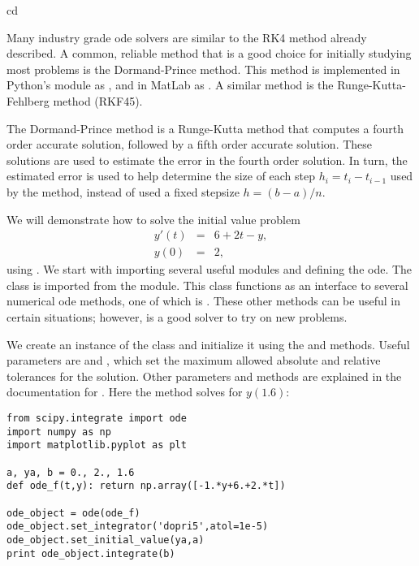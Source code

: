 cd 
\label{lab:DormandPrince}

Many industry grade ode solvers are similar to the RK4 method already described. A common, reliable method that is a good choice for initially studying most problems is the Dormand-Prince method. This method is implemented in Python's  module as , and in MatLab as . A similar method is the Runge-Kutta-Fehlberg method (RKF45). 

The Dormand-Prince method is a Runge-Kutta method that computes a fourth order accurate solution, followed by a fifth order accurate solution. These solutions are used to estimate the error in the fourth order solution. In turn, the estimated error is used to help determine the size of each step $h_i = t_i-t_{i-1}$ used by the method, instead of used a fixed stepsize $h = (b-a)/n$. 

We will demonstrate how to solve the initial value problem
\begin{eqnarray*}
y'(t) &=& 6+2t-y, \\
y(0) &=& 2,
\end{eqnarray*}
using . We start with importing several useful modules and defining the ode. 
The  class is imported from the  module. 
This class functions as an interface to several numerical ode methods, one of which is . 
These other methods can be useful in certain situations; however,  is a good solver to try on new problems. 



We create an instance of the  class and initialize it using the  and  methods. 
Useful parameters are  and , which set the maximum allowed absolute and relative tolerances for the solution. 
Other parameters and methods are explained in the documentation for .  
Here the method solves for $y(1.6)$:

\begin{lstlisting}
from scipy.integrate import ode
import numpy as np
import matplotlib.pyplot as plt

a, ya, b = 0., 2., 1.6
def ode_f(t,y): return np.array([-1.*y+6.+2.*t])

ode_object = ode(ode_f)
ode_object.set_integrator('dopri5',atol=1e-5) 
ode_object.set_initial_value(ya,a) 
print ode_object.integrate(b)
\end{lstlisting}

